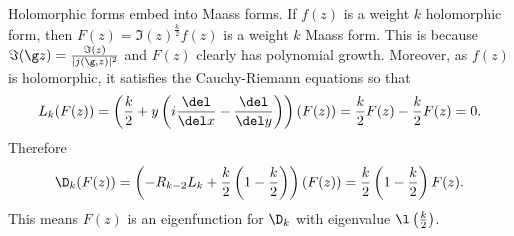     \begin{remark}\label{rem:holomorphic_embedds_into_Maass}
      Holomorphic forms embed into Maass forms. If $f(z)$ is a weight $k$ holomorphic form, then $F(z) = \Im(z)^{\frac{k}{2}}f(z)$ is a weight $k$ Maass form. This is because $\Im(\g z) = \frac{\Im(z)}{|j(\g,z)|^{2}}$ and $F(z)$ clearly has polynomial growth. Moreover, as $f(z)$ is holomorphic, it satisfies the Cauchy-Riemann equations so that
      \[
        L_{k}(F(z)) = \left(\frac{k}{2}+y\left(i\frac{\del}{\del x}-\frac{\del}{\del y}\right)\right)(F(z)) = \frac{k}{2}F(z)-\frac{k}{2}F(z) = 0.
      \]
      Therefore
      \[
        \D_{k}(F(z)) = \left(-R_{k-2}L_{k}+\frac{k}{2}\left(1-\frac{k}{2}\right)\right)(F(z)) = \frac{k}{2}\left(1-\frac{k}{2}\right)F(z).
      \]
      This means $F(z)$ is an eigenfunction for $\D_{k}$ with eigenvalue $\l\left(\frac{k}{2}\right)$.
    \end{remark}
  
